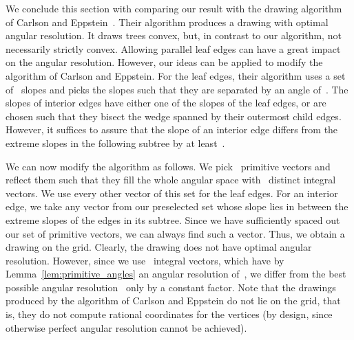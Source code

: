 \documentclass[a4paper,11pt]{article}
\theoremstyle{plain}
\begin{document}
We conclude this section with comparing our result with the drawing algorithm 
of Carlson and Eppstein~\cite{ce-tcfoa-GD06}. Their algorithm 
produces a drawing with optimal angular resolution. It draws trees 
convex, but, in contrast to our algorithm, not necessarily strictly
convex.  Allowing parallel leaf edges can have a great impact on the
angular resolution.  However, our ideas can be applied to modify the
algorithm of Carlson and Eppstein.  For the leaf edges, their algorithm uses  
a set of~ slopes and picks the slopes such that they are separated by an 
angle of~. The slopes of interior edges have either one of the slopes
of the leaf edges, or are chosen such that they bisect the 
wedge spanned by their outermost child edges. However, it suffices to
assure that the slope of an interior edge differs from the 
extreme slopes in the following subtree by at least~. 

We can now modify the algorithm as follows.
We pick~ primitive vectors and reflect them such that
they fill the whole angular space with~ distinct integral vectors. 
We use every other vector of this set for the leaf edges.
For an interior edge, we take any vector from our preselected set 
whose slope lies in between the extreme slopes of the edges in its subtree. 
Since we have sufficiently spaced out our set of primitive vectors, we can 
always find such a vector. Thus, we obtain a drawing on the
 grid. Clearly, the drawing does not have optimal 
angular resolution. However, since we use~ integral vectors, which have by 
Lemma~\ref{lem:primitive_angles} an angular resolution of~,
we differ from the best possible angular resolution~ only by 
a constant factor.  Note that the drawings produced by the algorithm of 
Carlson and Eppstein do not lie on the grid, that is, they do not compute 
rational coordinates for the vertices (by design, since otherwise perfect 
angular resolution cannot be achieved).
\end{document}
